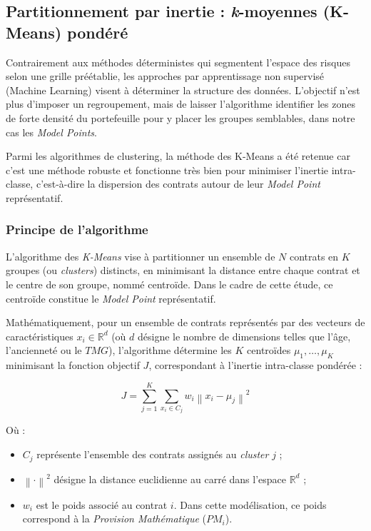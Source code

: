 \subsection{Partitionnement par inertie : \textit{k}-moyennes (K-Means) pondéré}

Contrairement aux méthodes déterministes qui segmentent l'espace des risques selon une grille préétablie, les approches par apprentissage non supervisé (Machine Learning) visent à déterminer la structure des données. L'objectif n'est plus d'imposer un regroupement, mais de laisser l'algorithme identifier les zones de forte densité du portefeuille pour y placer les groupes semblables, dans notre cas les \textit{Model Points}.

Parmi les algorithmes de clustering, la méthode des K-Means a été retenue car c'est une méthode robuste et fonctionne très bien pour minimiser l'inertie intra-classe, c'est-à-dire la dispersion des contrats autour de leur \textit{Model Point} représentatif.

\subsubsection{Principe de l'algorithme}
L'algorithme des \textit{K-Means} vise à partitionner un ensemble de $N$ contrats en $K$ groupes (ou \textit{clusters}) distincts, en minimisant la distance entre chaque contrat et le centre de son groupe, nommé centroïde. Dans le cadre de cette étude, ce centroïde constitue le \textit{Model Point} représentatif.

Mathématiquement, pour un ensemble de contrats représentés par des vecteurs de caractéristiques $x_i \in \mathbb{R}^d$ (où $d$ désigne le nombre de dimensions telles que l'âge, l'ancienneté ou le $TMG$), l'algorithme détermine les $K$ centroïdes $\mu_1, \dots, \mu_K$ minimisant la fonction objectif $J$, correspondant à l'inertie intra-classe pondérée :

\begin{equation}
    J = \sum_{j=1}^{K} \sum_{x_i \in C_j} w_i \left\lVert x_i - \mu_j \right\rVert^2
\end{equation}

Où :
\begin{itemize}
    \item $C_j$ représente l'ensemble des contrats assignés au \textit{cluster} $j$ ;
    \item $\left\lVert \cdot \right\rVert^2$ désigne la distance euclidienne au carré dans l'espace $\mathbb{R}^d$ ;
    \item $w_i$ est le poids associé au contrat $i$. Dans cette modélisation, ce poids correspond à la \textit{Provision Mathématique} ($PM_i$). 
\end{itemize}

